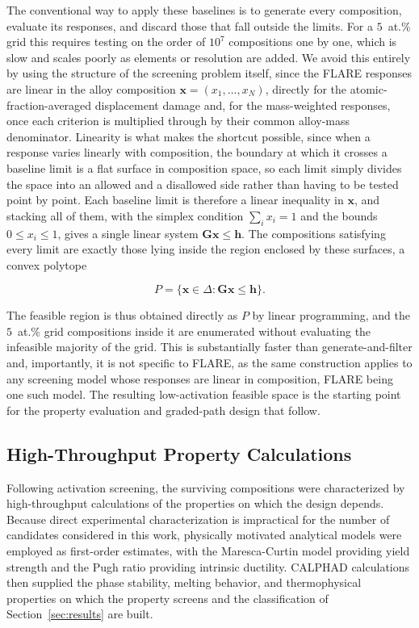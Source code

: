 The conventional way to apply these baselines is to generate every composition,
evaluate its responses, and discard those that fall outside the limits. For a
\(5\)~at.\% grid this requires testing on the order of \(10^{7}\) compositions one
by one, which is slow and scales poorly as elements or resolution are added. We
avoid this entirely by using the structure of the screening problem itself, since
the FLARE responses are linear in the alloy composition
\(\mathbf{x}=(x_1,\dots,x_N)\), directly for the atomic-fraction-averaged
displacement damage and, for the mass-weighted responses, once each criterion
is multiplied through by their common alloy-mass denominator. Linearity is what makes the shortcut
possible, since when a response varies linearly with composition, the boundary at which it crosses
a baseline limit is a flat surface in composition space, so each limit simply
divides the space into an allowed and a disallowed side rather than having to be
tested point by point. Each baseline limit is therefore a linear inequality in
\(\mathbf{x}\), and stacking all of them, with the simplex condition
\(\sum_i x_i = 1\) and the bounds \(0 \le x_i \le 1\), gives a single linear
system \(\mathbf{G}\mathbf{x} \le \mathbf{h}\). The compositions satisfying
every limit are exactly those lying inside the region enclosed by these surfaces, a
convex polytope

\begin{equation}
P=\{\mathbf{x}\in\Delta : \mathbf{G}\mathbf{x}\le\mathbf{h}\}.
\label{eq:polytope}
\end{equation}

The feasible region is thus obtained directly as \(P\) by linear programming, and
the \(5\)~at.\% grid compositions inside it are enumerated without evaluating the
infeasible majority of the grid. This is substantially faster than
generate-and-filter and, importantly, it is not specific to FLARE, as the same
construction applies to any screening model whose responses are linear in
composition, FLARE being one such model. The resulting low-activation feasible
space is the starting point for the property evaluation and graded-path design that
follow.

\subsection{High-Throughput Property Calculations}
\label{sec:feasible-space-props}

Following activation screening, the surviving compositions were
characterized by high-throughput calculations of the properties on which the
design depends. Because direct experimental characterization is impractical
for the number of candidates considered in this work, physically motivated
analytical models were employed as first-order estimates, with the
Maresca-Curtin model providing yield strength and the Pugh ratio providing
intrinsic ductility. CALPHAD calculations then supplied the phase stability,
melting behavior, and thermophysical properties on which the property
screens and the classification of Section~\ref{sec:results} are built.


